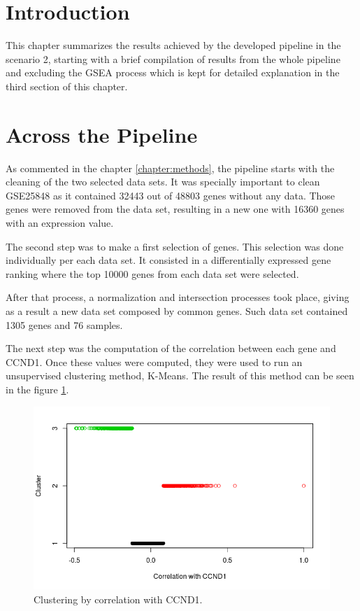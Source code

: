 \onehalfspacing

\section{Introduction}
This chapter summarizes the results achieved by the developed pipeline in the scenario 2, starting with a brief compilation of results from the whole pipeline and excluding the GSEA process which is kept for detailed explanation in the third section of this chapter.

\section{Across the Pipeline}

As commented in the chapter \ref{chapter:methods}, the pipeline starts with the cleaning of the two selected data sets.
It was specially important to clean GSE25848 as it contained 32443 out of 48803 genes without any data. Those genes were removed from the data set, resulting in a new one with 16360 genes with an expression value.

The second step was to make a first selection of genes. This selection was done individually per each data set. It consisted in a differentially expressed gene ranking where the top 10000 genes from each data set were selected.

After that process, a normalization and intersection processes took place, giving as a result a new data set composed by common genes. Such data set contained 1305 genes and 76 samples.

The next step was the computation of the correlation between each gene and CCND1. Once these values were computed, they were used to run an unsupervised clustering method, K-Means. The result of this method can be seen in the figure \ref{fig:cor_cluster}.

\begin{figure}[h!]
    \centering
    \includegraphics[scale=0.5]{../figs/cor_cluster.png}
    \caption{Clustering by correlation with CCND1.}
    \label{fig:cor_cluster}
\end{figure}

